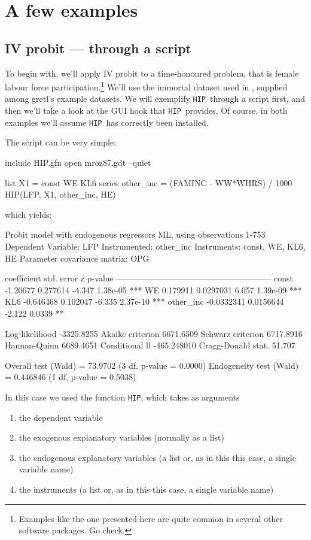 \documentclass[a4paper,10pt]{article}
\newcommand{\app}[1]{\textsf{#1}}
\newcounter{script}[section]
\newcommand{\HIP}{\texttt{HIP}}
\begin{document}
\section{A few examples}

\subsection{IV probit --- through a script}

To begin with, we'll apply IV probit to a time-honoured problem, that
is female labour force participation.\footnote{Examples like the one
  presented here are quite common in several other software
  packages. Go check.} We'll use the immortal dataset used in
\cite{Mroz87}, supplied among \app{gretl}'s example datasets. We will
exemplify \HIP\ through a script first, and then we'll take a look
at the GUI hook that \HIP\ provides. Of course, in both examples we'll
assume \HIP\ has correctly been installed.

The script can be very simple:

\begin{code}
include HIP.gfn
open mroz87.gdt --quiet

list X1 = const WE KL6
series other_inc = (FAMINC - WW*WHRS) / 1000
HIP(LFP, X1, other_inc, HE)
\end{code}

which yields:

\begin{code}
Probit model with endogenous regressors
ML, using observations 1-753
Dependent Variable: LFP 
Instrumented: other_inc
Instruments: const, WE, KL6, HE 
Parameter covariance matrix: OPG

              coefficient   std. error     z      p-value 
  --------------------------------------------------------
  const       -1.20677      0.277614     -4.347   1.38e-05 ***
  WE           0.179911     0.0297031     6.057   1.39e-09 ***
  KL6         -0.646468     0.102047     -6.335   2.37e-10 ***
  other_inc   -0.0332341    0.0156644    -2.122   0.0339   **

Log-likelihood       -3325.8255  Akaike criterion    6671.6509
Schwarz criterion     6717.8916  Hannan-Quinn        6689.4651
Conditional ll      -465.248010  Cragg-Donald stat.     51.707

Overall test (Wald) = 73.9702 (3 df, p-value = 0.0000)
Endogeneity test (Wald) = 0.446846 (1 df, p-value = 0.5038)
\end{code}

In this case we used the function \texttt{HIP}, which takes as
arguments
\begin{enumerate}
\item the dependent variable
\item the exogenous explanatory variables (normally as a list)
\item the endogenous explanatory variables (a list or, as in this this
  case, a single variable name)
\item the instruments (a list or, as in this this case, a single
  variable name)
\end{enumerate}
\end{document}
